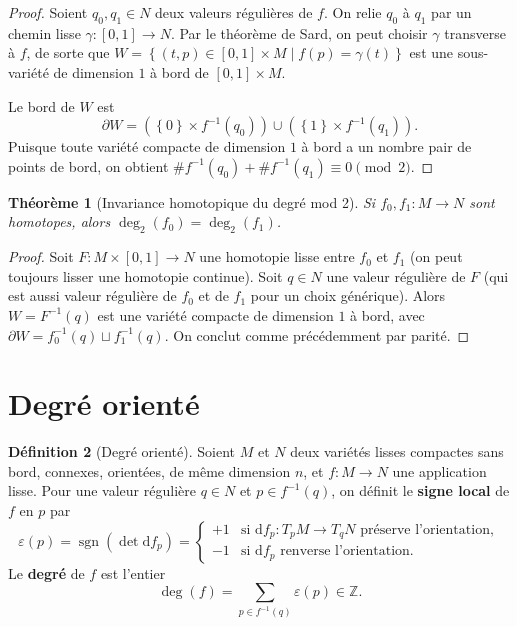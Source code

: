 \documentclass[12pt,a4paper,openany]{book}
\theoremstyle{definition}
\newtheorem{definition}{Définition}[chapter]
\theoremstyle{plain}
\newtheorem{theoreme}[definition]{Théorème}
\theoremstyle{remark}
\newcommand{\Z}{\mathbb{Z}}
\newcommand{\dd}{\mathrm{d}}
\newcommand{\set}[1]{\left\{#1\right\}}
\begin{document}
\begin{proof}
Soient $q_0, q_1 \in N$ deux valeurs régulières de $f$. On relie $q_0$ à $q_1$
par un chemin lisse $\gamma : [0,1] \to N$. Par le théorème de Sard, on peut
choisir $\gamma$ transverse à $f$, de sorte que $W = \set{(t, p) \in [0,1] \times M \mid f(p) = \gamma(t)}$
est une sous-variété de dimension $1$ à bord de $[0,1] \times M$.

Le bord de $W$ est
\[
  \partial W = (\set{0} \times f^{-1}(q_0)) \cup (\set{1} \times f^{-1}(q_1)).
\]
Puisque toute variété compacte de dimension $1$ à bord a un nombre pair de points
de bord, on obtient $\#f^{-1}(q_0) + \#f^{-1}(q_1) \equiv 0 \pmod{2}$.
\end{proof}

\begin{theoreme}[Invariance homotopique du degré mod 2]\label{thm:degre-mod2-htpie}
Si $f_0, f_1 : M \to N$ sont homotopes, alors $\deg_2(f_0) = \deg_2(f_1)$.
\end{theoreme}

\begin{proof}
Soit $F : M \times [0,1] \to N$ une homotopie lisse entre $f_0$ et $f_1$ (on
peut toujours lisser une homotopie continue). Soit $q \in N$ une valeur
régulière de $F$ (qui est aussi valeur régulière de $f_0$ et de $f_1$ pour un
choix générique). Alors $W = F^{-1}(q)$ est une variété compacte de dimension
$1$ à bord, avec $\partial W = f_0^{-1}(q) \sqcup f_1^{-1}(q)$. On conclut
comme précédemment par parité.
\end{proof}

\section{Degré orienté}\label{sec:degre-oriente}

\begin{definition}[Degré orienté]\label{def:degre-oriente}
Soient $M$ et $N$ deux variétés lisses compactes sans bord, connexes, orientées,
de même dimension $n$, et $f : M \to N$ une application lisse. Pour une valeur
régulière $q \in N$ et $p \in f^{-1}(q)$, on définit le \textbf{signe local} de
$f$ en $p$ par
\[
  \varepsilon(p) = \operatorname{sgn}(\det \dd f_p) =
  \begin{cases}
    +1 & \text{si } \dd f_p : T_pM \to T_qN \text{ préserve l'orientation}, \\
    -1 & \text{si } \dd f_p \text{ renverse l'orientation}.
  \end{cases}
\]
Le \textbf{degré} de $f$ est l'entier
\[
  \deg(f) = \sum_{p \in f^{-1}(q)} \varepsilon(p) \in \Z.
\]
\end{definition}
\end{document}
